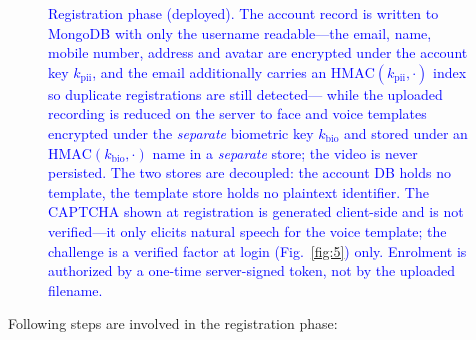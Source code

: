 \documentclass[10pt,journal,compsoc]{IEEEtran}
\begin{document}
\begin{figure}[!htbp]
\caption{\textcolor{blue}{Registration phase (deployed). The account record is written to MongoDB with only the username readable---the email, name, mobile number, address and avatar are encrypted under the account key $k_{\text{pii}}$, and the email additionally carries an $\mathrm{HMAC}(k_{\text{pii}},\cdot)$ index so duplicate registrations are still detected--- while the uploaded recording is reduced on the server to face and voice templates encrypted under the \emph{separate} biometric key $k_{\text{bio}}$ and stored under an $\mathrm{HMAC}(k_{\text{bio}},\cdot)$ name in a \emph{separate} store; the video is never persisted. The two stores are decoupled: the account DB holds no template, the template store holds no plaintext identifier. The CAPTCHA shown at registration is generated client-side and is not verified---it only elicits natural speech for the voice template; the challenge is a verified factor at login (Fig.~\ref{fig:5}) only. Enrolment is authorized by a one-time server-signed token, not by the uploaded filename.}}
\label{fig:4}
\end{figure}
Following steps are involved in the registration phase:
\end{document}
